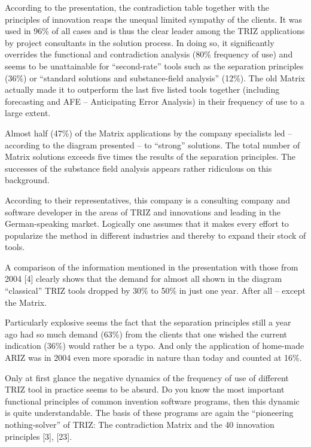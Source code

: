 \documentclass[11pt,a4paper]{article}
\begin{document}
According to the presentation, the contradiction table together with the
principles of innovation reaps the unequal limited sympathy of the clients.
It was used in 96\% of all cases and is thus the clear leader among the TRIZ
applications by project consultants in the solution process. In doing so, it
significantly overrides the functional and contradiction analysis (80\%
frequency of use) and seems to be unattainable for ``second-rate'' tools such
as the separation principles (36\%) or ``standard solutions and
substance-field analysis'' (12\%). The old Matrix actually made it to
outperform the last five listed tools together (including forecasting and AFE
-- Anticipating Error Analysis) in their frequency of use to a large extent.

Almost half (47\%) of the Matrix applications by the company specialists led
-- according to the diagram presented -- to ``strong'' solutions. The total
number of Matrix solutions exceeds five times the results of the separation
principles. The successes of the substance field analysis appears rather
ridiculous on this background.

According to their representatives, this company is a consulting company and
software developer in the areas of TRIZ and innovations and leading in the
German-speaking market. Logically one assumes that it makes every effort to
popularize the method in different industries and thereby to expand their
stock of tools.

A comparison of the information mentioned in the presentation with those from
2004 [4] clearly shows that the demand for almost all shown in the diagram
``classical'' TRIZ tools dropped by 30\% to 50\% in just one year.  After all
-- except the Matrix.

Particularly explosive seems the fact that the separation principles still a
year ago had so much demand (63\%) from the clients that one wished the
current indication (36\%) would rather be a typo. And only the application of
home-made ARIZ was in 2004 even more sporadic in nature than today and counted
at 16\%.

Only at first glance the negative dynamics of the frequency of use of
different TRIZ tool in practice seems to be absurd. Do you know the most
important functional principles of common invention software programs, then
this dynamic is quite understandable.  The basis of these programs are again
the ``pioneering nothing-solver'' of TRIZ: The contradiction Matrix and the 40
innovation principles [3], [23].
\end{document}
